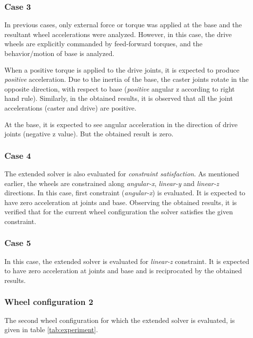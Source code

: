 \subsubsection*{Case 3}
\hspace{20pt}In previous cases, only external force or torque was applied at the base and the resultant wheel accelerations were analyzed. However, in this case, the drive wheels are explicitly commanded by feed-forward torques, and the behavior/motion of base is analyzed. 

When a positive torque is applied to the drive joints, it is expected to produce \textit{positive} acceleration. Due to the inertia of the base, the caster joints rotate in the opposite direction, with respect to base (\textit{positive} angular z according to right hand rule). Similarly, in the obtained results, it is observed that all the joint accelerations (caster and drive) are positive. 

At the base, it is expected to see angular acceleration in the direction of drive joints (negative z value). But the obtained result is zero. 

\subsubsection*{Case 4}
\hspace{20pt}The extended solver is also evaluated for \textit{constraint satisfaction}. As mentioned earlier, the wheels are constrained along \textit{angular-x}, \textit{linear-y} and \textit{linear-z} directions. In this case, first constraint (\textit{angular-x}) is evaluated. It is expected to have zero acceleration at joints and base. Observing the obtained results, it is verified that for the current wheel configuration the solver satisfies the given constraint.

\subsubsection*{Case 5}
\hspace{20pt}In this case, the extended solver is evaluated for \textit{linear-z} constraint. It is expected to have zero acceleration at joints and base and is reciprocated by the obtained results.

\subsubsection*{Wheel configuration 2}
The second wheel configuration for which the extended solver is evaluated, is given in table \ref{tab:experiment}. 

